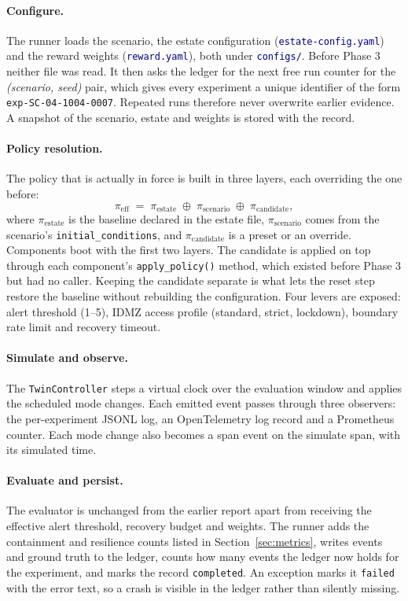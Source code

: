 \documentclass[11pt]{article}
\newcommand{\code}[1]{\texttt{\small #1}}
\newcommand{\file}[1]{\textcolor{navy}{\texttt{\small #1}}}
\begin{document}
\paragraph{Configure.} The runner loads the scenario, the estate configuration
(\file{estate-config.yaml}) and the reward weights (\file{reward.yaml}), both
under \file{configs/}. Before Phase 3 neither file was read.
It then asks the ledger for the next free run counter for the
\emph{(scenario, seed)} pair, which gives every experiment a unique identifier of
the form \code{exp-SC-04-1004-0007}. Repeated runs therefore never overwrite
earlier evidence. A snapshot of the scenario, estate and weights is stored with
the record.

\paragraph{Policy resolution.} The policy that is actually in force is built in
three layers, each overriding the one before:
\begin{equation}
\pi_{\text{eff}} \;=\; \pi_{\text{estate}} \;\oplus\; \pi_{\text{scenario}} \;\oplus\; \pi_{\text{candidate}},
\end{equation}
where $\pi_{\text{estate}}$ is the baseline declared in the estate file,
$\pi_{\text{scenario}}$ comes from the scenario's \code{initial\_conditions}, and
$\pi_{\text{candidate}}$ is a preset or an override. Components boot with the
first two layers. The candidate is applied on top through each component's
\code{apply\_policy()} method, which existed before Phase 3 but had no caller.
Keeping the candidate separate is what lets the reset step restore the baseline
without rebuilding the configuration. Four levers are exposed: alert threshold
(1--5), IDMZ access profile (standard, strict, lockdown), boundary rate limit and
recovery timeout.

\paragraph{Simulate and observe.} The \code{TwinController} steps a virtual clock
over the evaluation window and applies the scheduled mode changes. Each emitted
event passes through three observers: the per-experiment JSONL log, an
OpenTelemetry log record and a Prometheus counter. Each mode change also becomes a
span event on the simulate span, with its simulated time.

\paragraph{Evaluate and persist.} The evaluator is unchanged from the earlier
report apart from receiving the effective alert threshold, recovery budget and
weights. The runner adds the containment and resilience counts listed in
Section~\ref{sec:metrics}, writes events and ground truth to the ledger, counts
how many events the ledger now holds for the experiment, and marks the record
\code{completed}. An exception marks it \code{failed} with the error text, so a
crash is visible in the ledger rather than silently missing.
\end{document}
